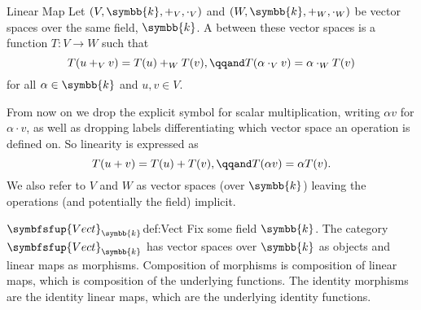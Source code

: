 \documentclass[fleqn]{NotesClass}
\makeatletter
\newcommand{\c@egory}[1]{\symbfsfup{#1}}
\renewcommand{\field}{\symbb{k}}
\newcommand{\Vect}[1][\field]{{\c@egory{Vect}_{#1}}}
\makeatother
\begin{document}
    \begin{dfn}{Linear Map}{}
        Let \((V, \field, +_V, \cdot_V)\) and \((W, \field, +_W, \cdot_W)\) be vector spaces over the same field, \(\field\).
        A  between these vector spaces is a function \(T \colon V \to W\) such that
        \begin{equation}
            T(u +_V v) = T(u) +_W T(v), \qqand T(\alpha \cdot_V v) = \alpha \cdot_W T(v)
        \end{equation}
        for all \(\alpha \in \field\) and \(u, v \in V\).
    \end{dfn}
    
    From now on we drop the explicit symbol for scalar multiplication, writing \(\alpha v\) for \(\alpha \cdot v\), as well as dropping labels differentiating which vector space an operation is defined on.
    So linearity is expressed as
    \begin{equation}
        T(u + v) = T(u) + T(v), \qqand T(\alpha v) = \alpha T(v).
    \end{equation}
    We also refer to \(V\) and \(W\) as vector spaces (over \(\field\)) leaving the operations (and potentially the field) implicit.
    
    \begin{dfn}{\normalsize\(\Vect\)}{def:Vect}
        Fix some field \(\field\).
        The category \(\Vect\)\index{Vect@\(\Vect\)} has vector spaces over \(\field\) as objects and linear maps as morphisms.
        Composition of morphisms is composition of linear maps, which is composition of the underlying functions.
        The identity morphisms are the identity linear maps, which are the underlying identity functions.
    \end{dfn}
    
\end{document}
